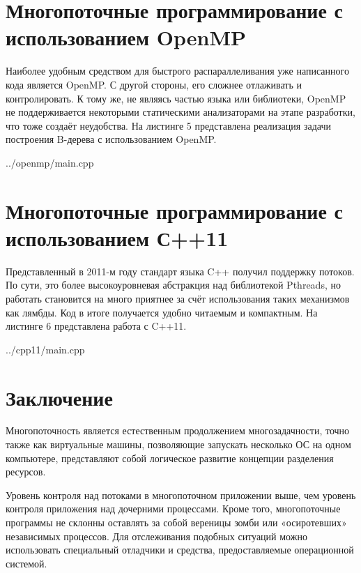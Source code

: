 \documentclass[a4paper, 12pt]{report}		%
\begin{document}
\chapter*{Многопоточные программирование с использованием OpenMP}

Наиболее удобным средством для быстрого распараллеливания уже написанного кода является OpenMP. С другой стороны, его сложнее отлаживать и контролировать. К тому же, не являясь частью языка или библиотеки, OpenMP не поддерживается некоторыми статическими анализаторами на этапе разработки, что тоже создаёт неудобства. На листинге 5 представлена реализация задачи построения B-дерева с использованием OpenMP.


{../openmp/main.cpp}


\chapter*{Многопоточные программирование с использованием С++11}

Представленный в 2011-м году стандарт языка C++ получил поддержку потоков. По сути, это более высокоуровневая абстракция над библиотекой Pthreads, но работать становится на много приятнее за счёт использования таких механизмов как лямбды. Код в итоге получается удобно читаемым и компактным. На листинге 6 представлена работа с C++11.


{../cpp11/main.cpp}


\chapter*{Заключение}

Многопоточность является естественным продолжением многозадачности, точно также как виртуальные машины, позволяющие запускать несколько ОС на одном компьютере, представляют собой логическое развитие концепции разделения ресурсов.
\vspace{1em}

Уровень контроля над потоками в многопоточном приложении выше, чем уровень контроля приложения над дочерними процессами. Кроме того, многопоточные программы не склонны оставлять за собой вереницы зомби или «осиротевших» независимых процессов. Для отслеживания подобных ситуаций можно использовать специальный отладчики и средства, предоставляемые операционной системой.
\vspace{1em}
\end{document}
